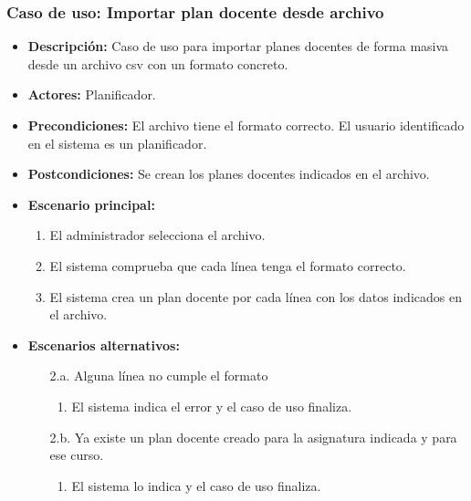 \subsubsection*{Caso de uso: Importar plan docente desde archivo}
\begin{itemize}
\item{\bf Descripción:} Caso de uso para importar planes docentes de forma masiva desde un archivo csv con un formato concreto.
\item{\bf Actores:} Planificador.
\item{\bf Precondiciones:} El archivo tiene el formato correcto. El usuario identificado en el sistema es un planificador.
\item{\bf Postcondiciones:} Se crean los planes docentes indicados en el archivo.
\item{\bf Escenario principal:}
	\begin{enumerate}
	\item El administrador selecciona el archivo.
	\item El sistema comprueba que cada línea tenga el formato correcto.
	\item El sistema crea un plan docente por cada línea con los datos indicados en el archivo.
	\end{enumerate}
\item{\bf Escenarios alternativos:}
	\begin{itemize}
		\item[2.a.] Alguna línea no cumple el formato
		\begin{enumerate}
			\item El sistema indica el error y el caso de uso finaliza.
		\end{enumerate}
		\item[2.b.] Ya existe un plan docente creado para la asignatura indicada y para ese curso.
		\begin{enumerate}
			\item El sistema lo indica y el caso de uso finaliza.
		\end{enumerate}
	\end{itemize}
\end{itemize}


